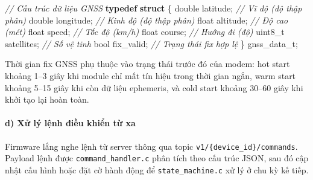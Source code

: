 \documentclass[13pt,a4paper]{extarticle}
\newenvironment{Shaded}{}{}
\newcommand{\CommentTok}[1]{\textcolor[rgb]{0.38,0.63,0.69}{\textit{#1}}}
\newcommand{\DataTypeTok}[1]{\textcolor[rgb]{0.56,0.13,0.00}{#1}}
\newcommand{\KeywordTok}[1]{\textcolor[rgb]{0.00,0.44,0.13}{\textbf{#1}}}
\newcommand{\NormalTok}[1]{#1}
\newcommand{\OperatorTok}[1]{\textcolor[rgb]{0.40,0.40,0.40}{#1}}
\renewcommand{\\}{\thesislongtableorignewline\hline}%
\begin{document}
\begin{Shaded}
\begin{Highlighting}[]
\CommentTok{// Cấu trúc dữ liệu GNSS}
\KeywordTok{typedef} \KeywordTok{struct} \OperatorTok{\{}
    \DataTypeTok{double}\NormalTok{   latitude}\OperatorTok{;}      \CommentTok{// Vĩ độ (độ thập phân)}
    \DataTypeTok{double}\NormalTok{   longitude}\OperatorTok{;}     \CommentTok{// Kinh độ (độ thập phân)}
    \DataTypeTok{float}\NormalTok{    altitude}\OperatorTok{;}      \CommentTok{// Độ cao (mét)}
    \DataTypeTok{float}\NormalTok{    speed}\OperatorTok{;}         \CommentTok{// Tốc độ (km/h)}
    \DataTypeTok{float}\NormalTok{    course}\OperatorTok{;}        \CommentTok{// Hướng đi (độ)}
    \DataTypeTok{uint8\_t}\NormalTok{  satellites}\OperatorTok{;}    \CommentTok{// Số vệ tinh}
    \DataTypeTok{bool}\NormalTok{     fix\_valid}\OperatorTok{;}     \CommentTok{// Trạng thái fix hợp lệ}
\OperatorTok{\}}\NormalTok{ gnss\_data\_t}\OperatorTok{;}
\end{Highlighting}
\end{Shaded}

Thời gian fix GNSS phụ thuộc vào trạng thái trước đó của modem: hot
start khoảng 1--3 giây khi module chỉ mất tín hiệu trong thời gian ngắn,
warm start khoảng 5--15 giây khi còn dữ liệu ephemeris, và cold start
khoảng 30--60 giây khi khởi tạo lại hoàn toàn.

\paragraph{d) Xử lý lệnh điều khiển từ
xa}\label{d-xux1eed-luxfd-lux1ec7nh-ux111iux1ec1u-khiux1ec3n-tux1eeb-xa}

Firmware lắng nghe lệnh từ server thông qua topic
\texttt{v1/\{device\_id\}/commands}. Payload lệnh được
\texttt{command\_handler.c} phân tích theo cấu trúc JSON, sau đó cập
nhật cấu hình hoặc đặt cờ hành động để \texttt{state\_machine.c} xử lý ở
chu kỳ kế tiếp.
\end{document}

